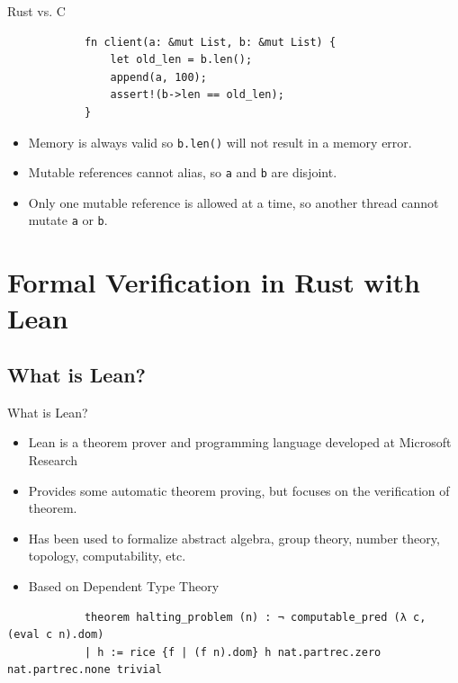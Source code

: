 \documentclass[usenames,dvipsnames,aspectratio=169]{beamer}
\begin{document}
\begin{frame}[fragile]{Rust vs. C}
    \begin{block}{}
        \begin{verbatim}
            fn client(a: &mut List, b: &mut List) {
                let old_len = b.len();
                append(a, 100);
                assert!(b->len == old_len);
            }
        \end{verbatim}
    \end{block}
    \begin{itemize}
        \item Memory is always valid so \texttt{b.len()} will not result in a memory error.
        \item Mutable references cannot alias, so \texttt{a} and \texttt{b} are disjoint.
        \item Only one mutable reference is allowed at a time, so another thread cannot mutate \texttt{a} or \texttt{b}.
    \end{itemize}
\end{frame}

\section{Formal Verification in Rust with Lean}
\begin{frame}\sectionpage\end{frame}

\subsection{What is Lean?}
\begin{frame}[fragile]{What is Lean?}
    \begin{itemize}
        \item Lean is a theorem prover and programming language developed at 
            Microsoft Research
        \item Provides some automatic theorem proving, but focuses on the 
            verification of theorem.
        \item Has been used to formalize abstract algebra, group theory, number theory,
            topology, computability, etc.
        \item Based on Dependent Type Theory
    \end{itemize}

    \begin{block}{}
        \begin{verbatim}
            theorem halting_problem (n) : ¬ computable_pred (λ c, (eval c n).dom)
            | h := rice {f | (f n).dom} h nat.partrec.zero nat.partrec.none trivial
        \end{verbatim}
    \end{block}
\end{frame}
\end{document}
